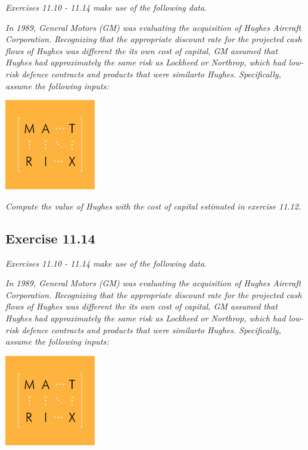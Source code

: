 \documentclass[]{book}
\theoremstyle{definition}
\theoremstyle{definition}
\theoremstyle{remark}
\begin{document}
\emph{Exercises 11.10 - 11.14 make use of the following data.}
\citep[p.389]{book}

\emph{In 1989, General Motors (GM) was evaluating the acquisition of
Hughes Aircraft Corporation. Recognizing that the appropriate discount
rate for the projected cash flows of Hughes was different the its own
cost of capital, GM assumed that Hughes had approximately the same risk
as Lockheed or Northrop, which had low-risk defence contracts and
products that were similarto Hughes. Specifically, assume the following
inputs:} \citep[p.389]{book}

\begin{center}\includegraphics[width=150px]{figures/matrix} \end{center}

\emph{Compute the value of Hughes with the cost of capital estimated in
exercise 11.12.} \citep[p.390]{book}

\subsection{Exercise 11.14}\label{exercise-11.14}

\emph{Exercises 11.10 - 11.14 make use of the following data.}
\citep[p.389]{book}

\emph{In 1989, General Motors (GM) was evaluating the acquisition of
Hughes Aircraft Corporation. Recognizing that the appropriate discount
rate for the projected cash flows of Hughes was different the its own
cost of capital, GM assumed that Hughes had approximately the same risk
as Lockheed or Northrop, which had low-risk defence contracts and
products that were similarto Hughes. Specifically, assume the following
inputs:} \citep[p.389]{book}

\begin{center}\includegraphics[width=150px]{figures/matrix} \end{center}
\end{document}
